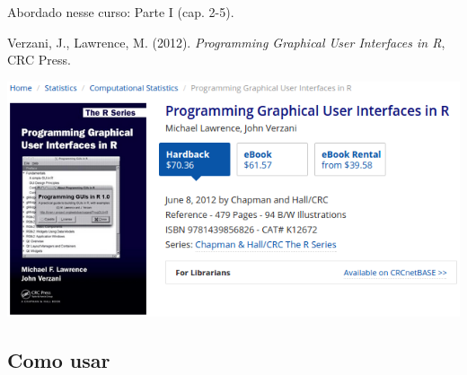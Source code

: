 \begin{frame}

  Abordado nesse curso: Parte I (cap. 2-5).  \vspace{1ex}

  Verzani, J., Lawrence, M. (2012). \emph{Programming Graphical User
    Interfaces in R}, CRC Press.

  \begin{center}
    \includegraphics[width=0.8\linewidth]{./images/ProgGUI-2.png}
  \end{center}

\end{frame}


\subsection{Como usar}


